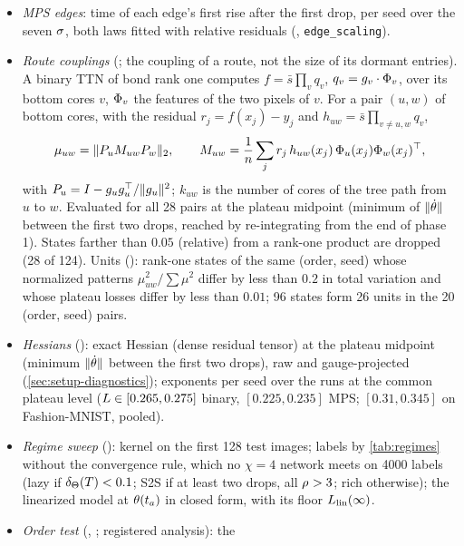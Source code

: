 \begin{itemize}
    compared by the relative rms residual.
  \item \emph{MPS edges}: time of each edge's first rise after the first drop, per seed over the seven
    $\sigma$, both laws fitted with relative residuals (, \texttt{edge\_scaling}).
  \item \emph{Route couplings} (; the coupling of a route, not the size of its dormant
    entries). A binary TTN of bond rank one computes
    $f=\bar s\prod_vq_v$, $q_v=g_v\cdot\Phi_v$, over its bottom cores $v$, $\Phi_v$ the features of the two pixels
    of $v$. For a pair $(u,w)$ of bottom cores, with the residual $r_j=f(x_j)-y_j$ and $h_{uw}=\bar s\prod_{v\ne u,w}q_v$,
    \begin{equation}\label{eq:real-route-amplitude}
      \mu_{uw}=\lVert P_uM_{uw}P_w\rVert_2,\qquad
      M_{uw}=\frac1{n}\sum_jr_j\,h_{uw}(x_j)\,\Phi_u(x_j)\Phi_w(x_j)^{\top},
    \end{equation}
    with $P_u=I-g_ug_u^{\top}/\lVert g_u\rVert^2$; $k_{uw}$ is the number of cores of the tree path from $u$ to $w$.
    Evaluated for all 28 pairs at the plateau midpoint (minimum of $\lVert\dot{\theta}\rVert$ between the first
    two drops, reached by re-integrating from the end of phase 1). States farther than $0.05$ (relative) from a rank-one product are
    dropped (28 of 124). Units (): rank-one states of the same (order, seed)
    whose normalized patterns $\mu_{uw}^2/\sum\mu^2$ differ by less than $0.2$ in total variation and whose
    plateau losses differ by less than $0.01$; 96 states form 26 units in the 20 (order, seed) pairs.
  \item \emph{Hessians} (): exact Hessian (dense residual tensor) at the
    plateau midpoint (minimum $\lVert\dot{\theta}\rVert$ between the first two drops), raw and gauge-projected
    (\cref{sec:setup-diagnostics}); exponents per seed over the runs at the common plateau level
    ($L\in[0.265,0.275]$ binary, $[0.225,0.235]$ MPS; $[0.31,0.345]$ on Fashion-MNIST, pooled).
  \item \emph{Regime sweep} (): kernel on the first 128 test images; labels by
    \cref{tab:regimes} without the convergence rule, which no $\chi=4$ network meets on 4000 labels (lazy if
    $\delta_{\Theta}(T)<0.1$; S2S if at least two drops, all $\rho_{}>3$; rich otherwise); the linearized model at
    $\theta(t_a)$ in closed form, with its floor $L_{\rm lin}(\infty)$.
  \item \emph{Order test} (, ; registered analysis): the

\end{itemize}
